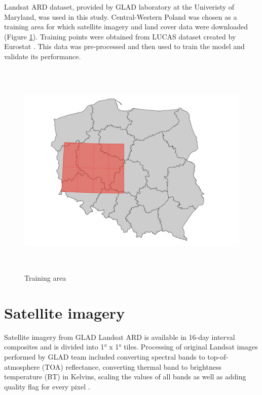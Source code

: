 \documentclass{amuthesis}
\begin{document}
Landsat ARD dataset, provided by GLAD laboratory at the Univeristy of
Maryland, was used in this study. Central-Western Poland was chosen as a
training area for which satellite imagery and land cover data were
downloaded (Figure \ref{fig-rycina1}). Training points were obtained
from LUCAS dataset created by Eurostat
\autocite{dandrimont_harmonised_2020}. This data was pre-processed and
then used to train the model and validate its performance.

\begin{figure}[t]

{\centering \includegraphics[width=1\textwidth,height=4.16667in]{./figures/study_area.png}

}

\caption{\label{fig-rycina1}Training area}

\end{figure}

\hypertarget{sec-sat}{%
\section{Satellite imagery}\label{sec-sat}}

Satellite imagery from GLAD Landsat ARD is available in 16-day interval
composites and is divided into 1° x 1° tiles. Processing of original
Landsat images performed by GLAD team included converting spectral bands
to top-of-atmosphere (TOA) reflectance, converting thermal band to
brightness temperature (BT) in Kelvins, scaling the values of all bands
as well as adding quality flag for every pixel
\autocite{potapov_landsat_2020}.
\end{document}
